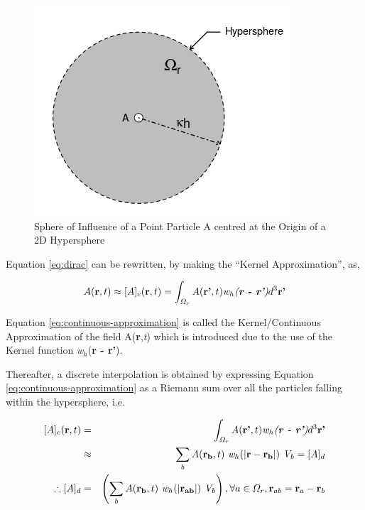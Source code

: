 \begin{figure}[htb!]
\centering
\setlength\fboxsep{0pt}
      \includegraphics[scale=0.6]{figures/SpInfContinuous_R.png}
\caption{{\small{Sphere of Influence of a Point Particle A centred at the Origin of a 2D Hypersphere}}}
\label{fig:sphere_influence}
\end{figure}
\newpage
Equation \eqref{eq:dirac} can be rewritten, by making the ``Kernel Approximation'',  as,

\begin{eqnarray} \label{eq:continuous-approximation}
 A(\textbf{r},t) \approx [A]_{c}(\textbf{r},t)= \int_{\varOmega_r} A(\textbf{r'},t) \textit{w$_h$(\textbf{r - r'})} d^{3}\textbf{r'}
\end{eqnarray}

Equation \eqref{eq:continuous-approximation} is called the Kernel/Continuous Approximation of the field A(\textbf{r},\textit{t}) which is introduced due to the use of the Kernel function \textit{w$_h$}(\textbf{r - r'}).

Thereafter, a discrete interpolation is obtained by expressing Equation \ref{eq:continuous-approximation} as a Riemann sum over all the particles falling within the hypersphere, i.e.

\begin{eqnarray} \label{eq:particle-approximation}
     [A]_{c}(\textbf{r},t) &=& \int_{\varOmega_r} A(\textbf{r'},t) \textit{w$_h$(\textbf{r - r'})} d^{3}\textbf{r'} \nonumber \\
     &\approx & \sum_{b}A(\textbf{$\bf{r}_b$},t)~\textit{w$_h$}(\textbf{$|\bf{r}-\bf{r}_b |$}) ~ \textit{V$_b$} = [A]_{d} \nonumber \\
     \therefore [A]_{d} &=& \left( \sum_{b}A(\textbf{$\bf{r}_b$},t)~\textit{w$_h$}(\textbf{$|\bf{r}_{ab} |$}) ~ \textit{V$_b$}\right) ,
     \forall a \in  \varOmega_r , \textbf{r}_{ab} = \textbf{r}_{a} - \textbf{r}_{b}
\end{eqnarray}

